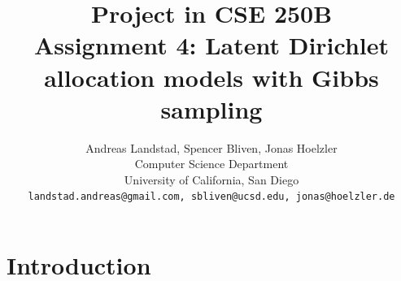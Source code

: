 \documentclass[10pt,twocolumn,letterpaper]{article}
\newcommand{\xb}{\bar{x}}
\begin{document}
\title{
Project in CSE 250B\\
Assignment 4: Latent Dirichlet allocation models with Gibbs sampling}
\author{Andreas Landstad, Spencer Bliven, Jonas Hoelzler\\
Computer Science Department\\
University of California, San Diego\\
{\tt\small landstad.andreas@gmail.com, sbliven@ucsd.edu, jonas@hoelzler.de}
}%
\maketitle
\thispagestyle{empty}
\begin{abstract}
\end{abstract}


\section{Introduction}
\end{document}
